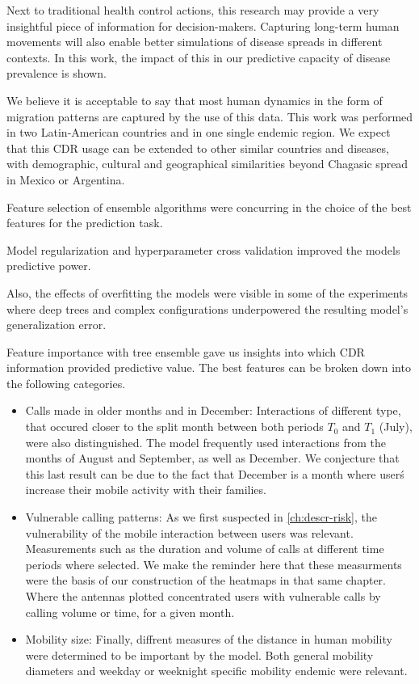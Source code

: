 Next to traditional health control actions, this research may provide a very insightful piece of information for decision-makers.
Capturing long-term human movements will also enable better simulations of disease spreads in different contexts.
In this work, the impact of this in our predictive capacity of disease prevalence is shown.



We believe it is acceptable to say that most human dynamics in the form of migration patterns are captured by the use of this data.
This work was performed in two Latin-American countries and in one single endemic region.
We expect that this CDR usage can be extended to other similar countries and diseases, with demographic, cultural and geographical similarities beyond Chagasic spread in Mexico or Argentina.


Feature selection of ensemble algorithms were concurring in the choice of the best features for the prediction task.

Model regularization and hyperparameter cross validation improved the models predictive power.

Also, the effects of overfitting the models were visible in some of the experiments where deep trees and complex configurations underpowered the resulting model's generalization error.

Feature importance with tree ensemble gave us insights into which CDR information provided
predictive value.
The best features can be broken down into the following categories.

\begin{itemize}

    \item Calls made in older months and in December: Interactions of different type, that occured closer to the split month between both periods $T_0$ and $T_1$ (July), were also distinguished.
    The model frequently used interactions from the months of August and September, as well as December.
    We conjecture that this last result can be due to the fact that December is a month where user\'s increase their mobile activity with their families.

    \item Vulnerable calling patterns: As we first suspected in \cref{ch:descr-risk}, the vulnerability of the mobile interaction between users was relevant.
    Measurements such as the duration and volume of calls at different time periods where selected.
    We make the reminder here that these measurments were the basis of our construction of the heatmaps in that same chapter.
    Where the antennas plotted concentrated users with vulnerable calls by calling volume or time, for a given month.

    \item Mobility size: Finally, diffrent measures of the distance in human mobility were
determined to be important by the model.
Both general mobility diameters and weekday or weeknight specific mobility endemic were relevant.

\end{itemize}

